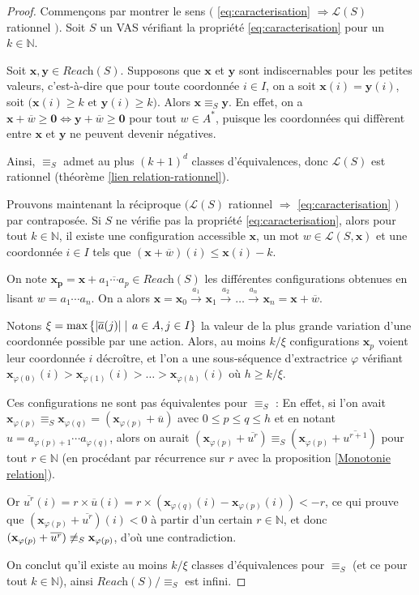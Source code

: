 \documentclass[a4paper,final]{article}
\theoremstyle{definition}
\let\phi\varphi
\let\leq\leqslant
\let\geq\geqslant
\newcommand{\set}[2]{\left\{#1\mathrel{\left|\vphantom{#1}\vphantom{#2}\right.}#2\right\}}
\newcommand{\abs}[1]{\ensuremath{\displaystyle\left\lvert #1 \right\rvert}}
\newcommand{\N}{\ensuremath{\mathbb{N}}}
\newcommand{\lang}{\ensuremath{\mathcal{L}}}
\newcommand{\reach}{\ensuremath{\textit{Reach}}}
\newcommand{\trans}[2]{\ensuremath{\stackrel{#1}{\longrightarrow}_{#2}}}
\newcommand{\vect}[1]{\ensuremath{\mathbf{#1}}}
\newcommand{\rel}{\ensuremath{\equiv}}
\newcommand{\equivaut}{\ensuremath{\Leftrightarrow}}
\newcommand{\valeur}[1]{\ensuremath{\overline{#1}}}
\begin{document}
\begin{proof}
Commençons par montrer le sens $\big($ \eqref{eq:caracterisation} $\Rightarrow \lang(S)$ rationnel $\big)$.
Soit $S$ un VAS vérifiant la propriété \eqref{eq:caracterisation} pour un $k\in\N$.

Soit $\vect{x},\vect{y}\in\reach(S)$.
Supposons que $\vect{x}$ et $\vect{y}$ sont indiscernables pour les petites valeurs, c'est-à-dire que pour toute coordonnée $i\in I$, on a 
soit $\vect{x}(i)=\vect{y}(i)$, 
soit $\big( \vect{x}(i)\geq k \text{ et } \vect{y}(i)\geq k \big)$.
Alors $\vect{x}\rel_S \vect{y}$. 
En effet, on a $\vect{x} +\valeur{w} \geq\vect{0} \equivaut \vect{y} +\valeur{w} \geq\vect{0}$ pour tout $w\in A^\ast$, 
puisque les coordonnées qui diffèrent entre $\vect{x}$ et $\vect{y}$ ne peuvent devenir négatives.

Ainsi, $\rel_S$ admet au plus $(k+1)^d$ classes d'équivalences, donc $\lang(S)$ est rationnel (théorème \ref{lien relation-rationnel}).

\vspace{4mm}\noindent
Prouvons maintenant la réciproque $\big(\lang(S)$ rationnel $\Rightarrow$ \eqref{eq:caracterisation} $\big)$ par contraposée.
Si $S$ ne vérifie pas la propriété \eqref{eq:caracterisation}, alors
pour tout $k\in\N$, il existe une configuration accessible $\vect{x}$, un mot $w\in \lang(S,\vect{x})$ et une coordonnée $i\in I$ tels que $(\vect{x} +\valeur{w})(i)\leq \vect{x}(i)-k$.

On note $\vect{x_p} = \vect{x} +\valeur{a_1\cdots a_p} \in\reach(S)$ les différentes configurations obtenues en lisant $w=a_1\cdots a_n$.
On a alors $\vect{x}=\vect{x}_0 \trans{a_1}{}\vect{x}_1 \trans{a_2}{}\dots \trans{a_n}{}\vect{x}_n= \vect{x} +\valeur{w}$.

Notons $\xi = \text{max}\set{\abs{\valeur{a}(j)}} {a\in A, j\in I}$ la valeur de la plus grande variation d'une coordonnée possible par une action.
Alors, au moins $k/\xi$ configurations $\vect{x}_p$ voient leur coordonnée $i$ décroître,
et l'on a une sous-séquence d'extractrice $\phi$ vérifiant $\vect{x}_{\phi(0)}(i)>\vect{x}_{\phi(1)}(i)>\dots>\vect{x}_{\phi(h)}(i)$ où $h\geq k/\xi$.


Ces configurations ne sont pas équivalentes pour $\rel_S$ :
En effet, si l'on avait $\vect{x}_{\phi(p)}\rel_S \vect{x}_{\phi(q)} = (\vect{x}_{\phi(p)} +\valeur{u})$ avec $0\leq p\leq q\leq h$ et en notant $u=a_{\phi(p)+1}\cdots a_{\phi(q)}$, 
alors on aurait $(\vect{x}_{\phi(p)} +\valeur{u^r}) \rel_S (\vect{x}_{\phi(p)} +\valeur{u^{r+1}})$ pour tout $r\in\N$ (en procédant par récurrence sur $r$ avec la proposition \ref{Monotonie relation}).

Or $\valeur{u^r}(i) = r\times\valeur{u}(i) = r\times (\vect{x}_{\phi(q)}(i) -\vect{x}_{\phi(p)}(i)) < -r$, 
ce qui prouve que $(\vect{x}_{\phi(p)} +\valeur{u^r})(i)<0$ à partir d'un certain $r\in\N$, 
et donc $(\vect{x}_{\phi(p)} +\valeur{u^r}) \not\rel_S \vect{x}_{\phi(p)}$, d'où une contradiction.

On conclut qu'il existe au moins $k/\xi$ classes d'équivalences pour $\rel_S$ (et ce pour tout $k\in\N$), 
ainsi $\reach(S)/\rel_S$ est infini.
\end{proof}
\end{document}
